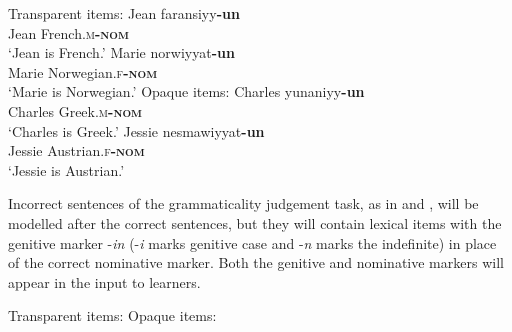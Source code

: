 \documentclass[output=paper,colorlinks,citecolor=brown,modfonts,nonflat]{../langscibook}
\begin{document}
\ea%
    \label{ex:watorek:5}
    \ea%
    \label{ex:watorek:5a}
    Transparent items:
        \ea%
        \label{ex:watorek:5ai}
        \gll    Jean faransiyy\textbf{{-un}}\\
                Jean French\textsc{.m\textbf{-nom}}\\
        \glt    ‘Jean is French.’
        \ex%
        \label{ex:watorek:5aii}
        \gll    Marie norwiyyat\textbf{{-un}}\\
                Marie Norwegian\textsc{.f\textbf{-nom}}\\
        \glt    ‘Marie is Norwegian.’
        \z
    \ex%
    \label{ex:watorek:5b}
    Opaque items:
        \ea%
        \label{ex:watorek:5bi}
        \gll    Charles yunaniyy\textbf{{-un}}\\
                Charles Greek\textsc{.m\textbf{-nom}}\\
        \glt    ‘Charles is Greek.’
        \ex%
        \label{ex:watorek:5bii}
        \gll    Jessie nesmawiyyat\textbf{{-un}}\\
                Jessie Austrian\textsc{.f\textbf{-nom}}\\
        \glt    ‘Jessie is Austrian.’
        \z
    \z
\z

Incorrect sentences of the grammaticality judgement task, as in  and , will be modelled after the correct sentences, but they will contain lexical items with the genitive marker -\textit{in} (-\textit{i} marks genitive case and -\textit{n} marks the indefinite) in place of the correct nominative marker. Both the genitive and nominative markers will appear in the input to learners.

\ea%
    \label{ex:watorek:6}
    \ea%
    \label{ex:watorek:6a}
    Transparent items:
        \z
    \ex%
    \label{ex:watorek:6b}
    Opaque items:
        \z
    \z
\z
\end{document}

